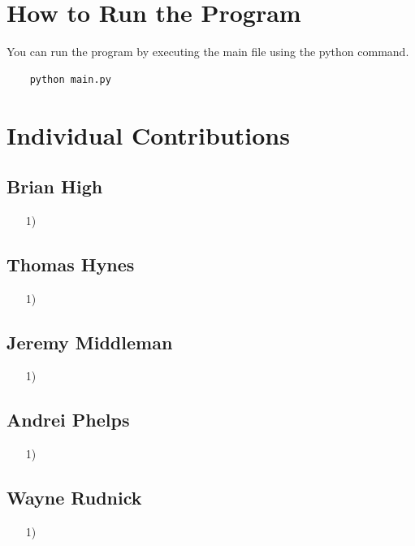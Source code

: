 \documentclass{article}
\begin{document}
\section{How to Run the Program}
You can run the program by executing the main file using the python command.
\begin{verbatim}
    python main.py
\end{verbatim}

\section{Individual Contributions}

\subsection{Brian High}
\begin{itemize}
    \item[1)] 
\end{itemize}

\subsection{Thomas Hynes}
\begin{itemize}
    \item[1)] 
\end{itemize}

\subsection{Jeremy Middleman}
\begin{itemize}
    \item[1)] 
\end{itemize}

\subsection{Andrei Phelps}
\begin{itemize}
    \item[1)]  
\end{itemize}

\subsection{Wayne Rudnick}
\begin{itemize}
    \item[1)] 
\end{itemize}
\end{document}
